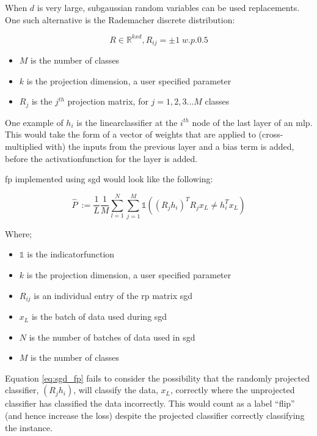 When $d$ is very large, subgaussian random variables can be used replacements. One such alternative is the Rademacher discrete distribution:

\begin{equation}
R \in \mathds{R}^{kxd}, R_{ij} = \pm 1 \; w.p. 0.5 
\end{equation}

\begin{itemize}
\itemsep-1em 
\item $M$ is the number of classes  
\item $k$ is the projection dimension, a user specified parameter 
\item $R_{j}$ is the $j^{th}$ projection matrix, for $j = 1,2,3 ... M$ classes 
\end{itemize}

One example of $h_i$ is the \gls{linearclassifier} at the $i^{th}$ node of the last layer of an \gls{mlp}. This would take the form of a vector of weights that are applied to (cross-multiplied with) the inputs from the previous layer and a bias term is added, before the \gls{activationfunction} for the layer is added.
\bigskip

\bigskip

\gls{fp} implemented using  \gls{sgd} would look like the following:

\begin{equation}
\hat{P}\ := \frac{1}{L}\frac{1}{M}\sum_{l = 1}^N \sum_{j = 1}^M \mathds{1}((R_j h_i)^T R_jx_L \neq h_i^Tx_L)  
\label{eq:sgd_fp}
\end{equation}

Where;  \smallskip

\begin{itemize}
\itemsep-1em 
\item $\mathds{1}$ is the \gls{indicatorfunction}  
\item $k$ is the projection dimension, a user specified parameter 
\item $R_{ij}$ is an individual entry of the \gls{rp} matrix  \gls{sgd} 
\item $x_L$ is the batch of data used during  \gls{sgd}  
\item $N$ is the number of batches of data used in  \gls{sgd}  
\item $M$ is the number of classes %
\end{itemize}

Equation \ref{eq:sgd_fp} fails to consider the possibility that the randomly projected classifier,  $(R_j h_i)$, will classify the data, $x_L$, correctly where the unprojected classifier has classified the data incorrectly. This would count as a label \enquote{flip} (and hence increase the \gls{loss}) despite the projected classifier correctly classifying the instance.
\bigskip

